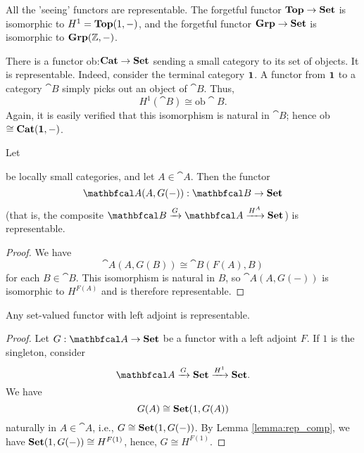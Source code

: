 \begin{example}
All the 'seeing' functors are representable. The forgetful functor $\mathbf{Top}\to\mathbf{Set}$ is isomorphic to $H^1=\mathbf{Top}(1,-)$, and the forgetful functor $\mathbf{Grp}\to\mathbf{Set}$ is isomorphic to $\mathbf{Grp}(\mathbb{Z},-)$.
\end{example}

\begin{example}
    There is a functor ob:$\mathbf{Cat}\to\mathbf{Set}$ sending a small category to its set of objects. It is representable. Indeed, consider the terminal category $\mathbf{1}$. A functor from $\mathbf{1}$ to a category $\cat{B}$ simply picks out an object of $\cat{B}$. Thus,
    \begin{equation*}
        H^1(\cat{B})\cong\text{ob}\cat{B}.
    \end{equation*}
    Again, it is easily verified that this isomorphism is natural in $\cat{B}$; hence ob$\cong\mathbf{Cat}(\mathbf{1},-)$.
\end{example}

\begin{lemma}\label{lemma:rep_comp}
    Let  be locally small categories, and let $A\in\cat{A}$. Then the functor
    \begin{equation*}
        \cat{A}(A,G(-)): \cat{B}\to\bcat{Set}
    \end{equation*}
    (that is, the composite $\cat{B} \xrightarrow{G} \cat{A} \xrightarrow{H^A} \bcat{Set}$) is representable.
\end{lemma}
\begin{proof}
    We have
    \begin{equation*}
        \cat{A}(A,G(B))\cong \cat{B}(F(A),B)
    \end{equation*}
    for each $B\in\cat{B}$. This isomorphism is natural in $B$, so $\cat{A}(A,G(-))$ is isomorphic to $H^{F(A)}$ and is therefore representable.
\end{proof}

\begin{proposition}
    Any set-valued functor with left adjoint is representable.
\end{proposition}
\begin{proof}
    Let $G:\cat{A}\to\bcat{Set}$ be a functor with a left adjoint $F$. If $1$ is the singleton, consider
    \begin{equation*}
        \cat{A}\xrightarrow{G}\bcat{Set}\xrightarrow{H^1}\bcat{Set}.
    \end{equation*}
    We have
    \begin{equation*}
        G(A)\cong\mathbf{Set}(1,G(A))
    \end{equation*}
    naturally in $A\in\cat{A}$, i.e., $G\cong \mathbf{Set}(1,G(-))$. By Lemma \ref{lemma:rep_comp}, we have $\mathbf{Set}(1,G(-))\cong H^{F(1)}$, hence, $G\cong H^{F(1)}$.
\end{proof}

